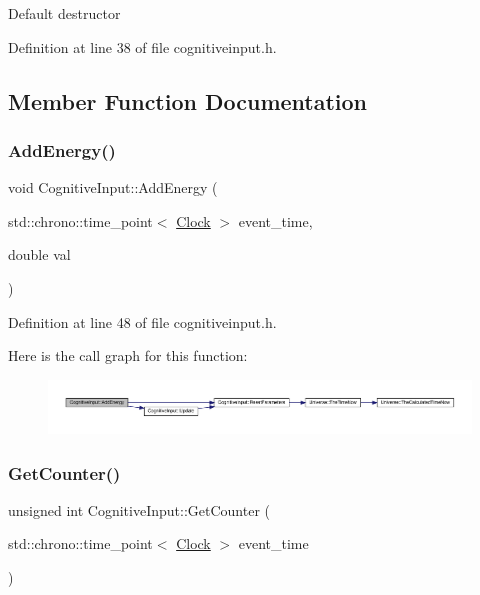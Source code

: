 Default destructor 

Definition at line 38 of file cognitiveinput.\+h.



\subsection{Member Function Documentation}
\mbox{\label{class_cognitive_input_a23f56d012233f655e1530ab61d80c27f}} 
\subsubsection{\texorpdfstring{Add\+Energy()}{AddEnergy()}}
{\footnotesize\ttfamily void Cognitive\+Input\+::\+Add\+Energy (\begin{DoxyParamCaption}\item[{std\+::chrono\+::time\+\_\+point$<$ \hyperlink{universe_8h_a0ef8d951d1ca5ab3cfaf7ab4c7a6fd80}{Clock} $>$}]{event\+\_\+time,  }\item[{double}]{val }\end{DoxyParamCaption})\hspace{0.3cm}{\ttfamily [inline]}}



Definition at line 48 of file cognitiveinput.\+h.

Here is the call graph for this function\+:
\nopagebreak
\begin{figure}[H]
\begin{center}
\leavevmode
\includegraphics[width=350pt]{class_cognitive_input_a23f56d012233f655e1530ab61d80c27f_cgraph}
\end{center}
\end{figure}
\mbox{\label{class_cognitive_input_a695e7e57b717210b64f9e2c4e26c8044}} 
\subsubsection{\texorpdfstring{Get\+Counter()}{GetCounter()}}
{\footnotesize\ttfamily unsigned int Cognitive\+Input\+::\+Get\+Counter (\begin{DoxyParamCaption}\item[{std\+::chrono\+::time\+\_\+point$<$ \hyperlink{universe_8h_a0ef8d951d1ca5ab3cfaf7ab4c7a6fd80}{Clock} $>$}]{event\+\_\+time }\end{DoxyParamCaption})\hspace{0.3cm}{\ttfamily [inline]}}




